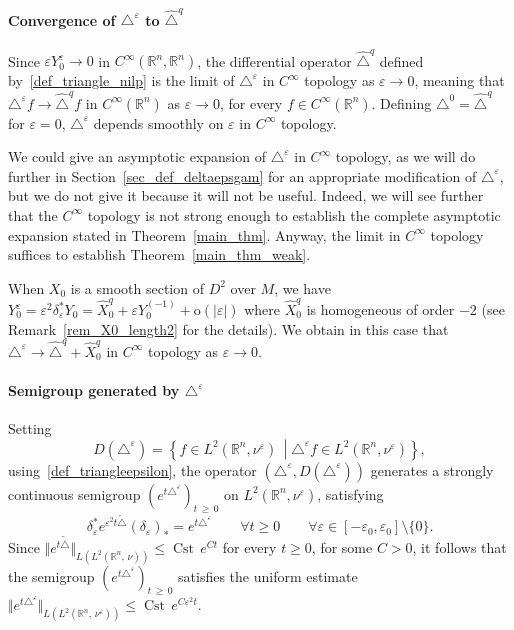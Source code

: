 \documentclass[10pt]{amsart}
\theoremstyle{definition}\newtheorem{defi}[theo]{Definition}\newtheorem{rema}[theo]{Remark}\newtheorem{exam}[theo]{Example}\newtheorem{exem}[theo]{Example}\newtheorem{nota}[theo]{Notation}
\newcommand*\R{\mathbb{R}}
\newcommand{\rmo}{\mathrm{o}}
\DeclareMathOperator{\Cst}{Cst}
\renewcommand{\geq}{\geqslant}
\renewcommand{\leq}{\leqslant}
\let\oldforall\forall
\renewcommand*{\forall}{\mathrel{\oldforall}}
\begin{document}
\paragraph{Convergence of $\triangle^\varepsilon$ to $\widehat{\triangle}^{q}$}
Since $\varepsilon Y^\varepsilon_0 \rightarrow 0$ in $C^\infty(\R^n,\R^n)$, the differential operator $\widehat{\triangle}^{q}$ defined by~\eqref{def_triangle_nilp} is the limit of $\triangle^\varepsilon$ in $C^\infty$ topology as $\varepsilon\rightarrow 0$, meaning that $\triangle^\varepsilon f\rightarrow \widehat{\triangle}^{q} f$ in $C^\infty(\R^n)$ as $\varepsilon\rightarrow 0$, for every $f\in C^\infty(\R^n)$. Defining $\triangle^0=\widehat{\triangle}^{q}$ for $\varepsilon=0$, $\triangle^\varepsilon$ depends smoothly on $\varepsilon$ in $C^\infty$ topology.

We could give an asymptotic expansion of $\triangle^\varepsilon$ in $C^\infty$ topology, as we will do further in Section~\ref{sec_def_deltaepsgam} for an appropriate modification of $\triangle^\varepsilon$, but we do not give it because it will not be useful. Indeed, we will see further that the $C^\infty$ topology is not strong enough to establish the complete asymptotic expansion stated in Theorem~\ref{main_thm}. Anyway, the limit in $C^\infty$ topology suffices to establish Theorem~\ref{main_thm_weak}.


When $X_0$ is a smooth section of $D^2$ over $M$, we have $Y_0^\varepsilon = \varepsilon^2\delta_\varepsilon^* Y_0 = \widehat{X}_0^{q} + \varepsilon Y_0^{(-1)} + \rmo(\vert\varepsilon\vert)$ where $\widehat{X}_0^{q}$ is homogeneous of order $-2$ (see Remark~\ref{rem_X0_length2} for the details). We obtain in this case that $\triangle^\varepsilon\rightarrow \widehat{\triangle}^{q} +\widehat{X}_0^{q}$ in $C^\infty$ topology as $\varepsilon\rightarrow 0$.

\goodbreak
\paragraph{Semigroup generated by $\triangle^\varepsilon$} Setting
\[
D(\triangle^\varepsilon) = \left\{ f\in L^2\left(\R^n,\nu^\varepsilon\right) \, \middle| \triangle^\varepsilon f \in L^2\left(\R^n,\nu^\varepsilon\right) \right\},
\]
using~\eqref{def_triangleepsilon}, the operator $(\triangle^\varepsilon,D(\triangle^\varepsilon))$ generates a strongly continuous semigroup $(e^{t\triangle^\varepsilon})_{t\,\geq\,0}$ on $L^2(\R^n,\nu^\varepsilon)$, satisfying
\[
\delta_\varepsilon^*e^{\varepsilon^2 t\widetilde\triangle}(\delta_\varepsilon)_* = e^{t\triangle^\varepsilon}\qquad \forall t\geq 0\qquad \forall \varepsilon\in[-\varepsilon_0,\varepsilon_0]\setminus\{0\}.
\]
Since $\Vert e^{t\widetilde\triangle}\Vert_{L(L^2(\R^n,\,\nu))} \leq \Cst\, e^{C t}$ for every $t\geq 0$, for some $C>0$, it follows that the semigroup $(e^{t\triangle^\varepsilon})_{t\,\geq \,0}$ satisfies the uniform estimate $\Vert e^{t\triangle^\varepsilon}\Vert_{L(L^2(\R^n,\,\nu^\varepsilon))} \leq \Cst\, e^{C\varepsilon^2 t}$.
\end{document}
